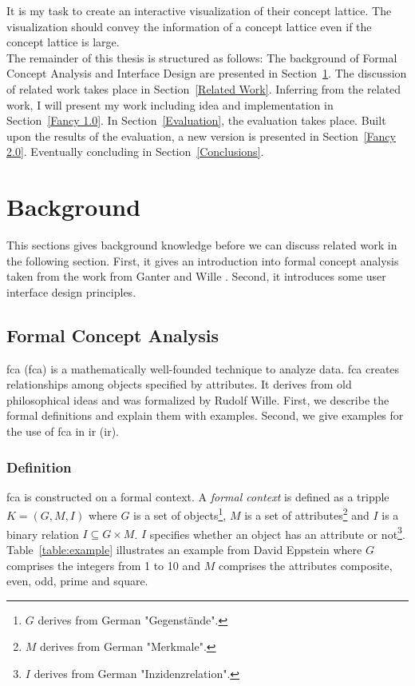 \documentclass[11pt]{report}
\begin{document}
It is my task to create an interactive visualization of their concept lattice. The visualization should convey the information of a concept lattice even if the concept lattice is large. \\

 The remainder of this thesis is structured as follows: The background of Formal Concept Analysis and Interface Design are presented in Section~\ref{Background}. The discussion of related work takes place in Section~\ref{Related Work}. Inferring from the related work, I will present my work including idea and implementation in Section~\ref{Fancy 1.0}. In Section~\ref{Evaluation}, the evaluation takes place. Built upon the results of the evaluation, a new version is presented in Section~\ref{Fancy 2.0}. Eventually concluding in Section~\ref{Conclusions}.
 
\chapter{Background}
\label{Background}

This sections gives background knowledge before we can discuss related work in the following section. First, it gives an introduction into formal concept analysis taken from the work from Ganter and Wille \cite{Ganter2012}. Second, it introduces some user interface design principles.

\section{Formal Concept Analysis}
\label{Formal Concept Analysis}

\acrlong{fca} (\acrshort{fca}) is a mathematically well-founded technique to analyze data. \acrshort{fca} creates relationships among objects specified by attributes. It derives from old philosophical ideas and was formalized by Rudolf Wille. First, we describe the formal definitions and explain them with examples. Second, we give examples for the use of \acrshort{fca} in \acrlong{ir} (\acrshort{ir}).

\subsection{Definition}

\acrshort{fca} \cite{Ganter2012} is constructed on a formal context. A \textit{formal context} is defined as a tripple $K = (G, M, I)$ where $G$ is a set of objects\footnote{$G$ derives from German "Gegenstände".}, $M$ is a set of attributes\footnote{$M$ derives from German "Merkmale".} and $I$ is a binary relation $I \subseteq G \times M$. $I$ specifies whether an object has an attribute or not\footnote{$I$ derives from German "Inzidenzrelation".}. Table~\ref{table:example} illustrates an example from David Eppstein \cite{fcaexample} where $G$ comprises the integers from 1 to 10 and $M$ comprises the attributes composite, even, odd, prime and square. \\
\end{document}
